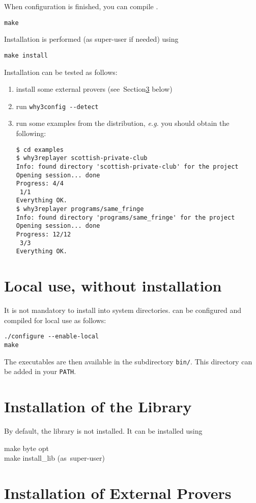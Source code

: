 When configuration is finished, you can compile \why.
\begin{verbatim}
make
\end{verbatim}
Installation is performed (as super-user if needed) using
\begin{verbatim}
make install
\end{verbatim}
Installation can be tested as follows: 
\begin{enumerate}
\item install some external provers (see~Section\ref{provers} below)
\item run \verb|why3config --detect|
\item run some examples from the distribution, \emph{e.g.} you should
obtain the following:
\begin{verbatim}
$ cd examples
$ why3replayer scottish-private-club
Info: found directory 'scottish-private-club' for the project
Opening session... done
Progress: 4/4
 1/1
Everything OK.
$ why3replayer programs/same_fringe
Info: found directory 'programs/same_fringe' for the project
Opening session... done
Progress: 12/12
 3/3
Everything OK.
\end{verbatim}
\end{enumerate}

\section{Local use, without installation}

It is not mandatory to install \why into system directories.
\why can be configured and compiled for local use as follows:
\begin{verbatim}
./configure --enable-local
make
\end{verbatim}
The \why executables are then available in the subdirectory
\texttt{bin/}. This directory can be added in your \texttt{PATH}.

\section{Installation of the \why Library}
\label{sec:installlib}

By default, the \why library is not installed. It can be installed using
\begin{flushleft}\ttfamily
make byte opt \\
make install\_lib \mbox{\rmfamily (as super-user)}
\end{flushleft}

\section{Installation of External Provers}
\label{provers}

